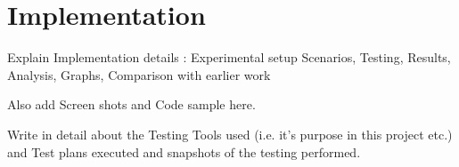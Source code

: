\chapter{Implementation}


	Explain Implementation details :
	Experimental setup
	Scenarios, Testing, Results, Analysis, Graphs, Comparison with earlier work
	
	Also add Screen shots and Code sample here.
	
	Write in detail about the Testing Tools used (i.e. it's purpose in this project etc.) and Test plans executed and snapshots of the testing performed.
	